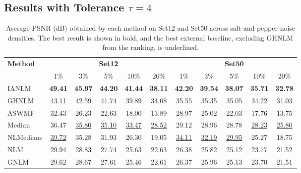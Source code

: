\documentclass[pdflatex,iicol,sn-mathphys-num]{sn-jnl}
\newcommand{\method}{IANLM\xspace}
\newcommand{\ghnlm}{GHNLM\xspace}
\newcommand{\nlm}{NLM\xspace}
\newcommand{\gnlm}{GNLM\xspace}
\newcommand{\aswmf}{ASWMF\xspace}
\newcommand{\nlmedian}{NLMedians\xspace}
\begin{document}
\subsection{Results with Tolerance \texorpdfstring{$\tau=4$}{tau=4}}
\label{subsec:results_tau4}
\begin{table}[!t]
  \centering
  \caption{Average PSNR (dB) obtained by each method on Set12 and Set50 across salt-and-pepper noise densities. The best result is shown in bold, and the best external baseline, excluding GHNLM from the ranking, is underlined.}
  \label{tab:psnr_by_density}
  \scriptsize
  \setlength{\tabcolsep}{4pt}
  \renewcommand{\arraystretch}{1.12}
  \begin{tabular*}{\textwidth}{@{\extracolsep{\fill}}lccccc|ccccc}
  \toprule
  \multirow{2}{*}{\textbf{Method}} &
  \multicolumn{5}{c|}{\textbf{Set12}} &
  \multicolumn{5}{c}{\textbf{Set50}} \\
  \cmidrule(lr){2-6}\cmidrule(lr){7-11}
  & 1\% & 3\% & 5\% & 10\% & 20\%
  & 1\% & 3\% & 5\% & 10\% & 20\% \\
  \midrule

  \method
  & \textbf{49.41}
  & \textbf{45.97}
  & \textbf{44.20}
  & \textbf{41.44}
  & \textbf{38.11}
  & \textbf{42.20}
  & \textbf{39.54}
  & \textbf{38.07}
  & \textbf{35.71}
  & \textbf{32.78} \\

  \ghnlm
  & 43.11
  & 42.59
  & 41.74
  & 39.89
  & 34.08
  & 35.55
  & 35.35
  & 35.05
  & 34.22
  & 31.03 \\

  \aswmf
  & 32.43
  & 26.23
  & 22.63
  & 18.00
  & 13.89
  & 28.97
  & 25.02
  & 22.03
  & 17.76
  & 13.75 \\

  Median
  & 36.47
  & \underline{35.80}
  & \underline{35.10}
  & \underline{33.47}
  & \underline{28.52}
  & 29.12
  & 28.96
  & 28.78
  & \underline{28.23}
  & \underline{25.80} \\

  \nlmedian
  & \underline{39.72}
  & 35.28
  & 31.93
  & 26.30
  & 19.05
  & \underline{34.11}
  & \underline{32.19}
  & \underline{29.95}
  & 25.27
  & 18.75 \\

  \nlm
  & 29.94
  & 28.83
  & 27.74
  & 25.63
  & 22.63
  & 26.38
  & 25.82
  & 25.12
  & 23.77
  & 21.52 \\

  \gnlm
  & 29.62
  & 28.67
  & 27.61
  & 25.46
  & 22.61
  & 26.37
  & 25.96
  & 25.13
  & 23.70
  & 21.51 \\

  \bottomrule
  \end{tabular*}
\end{table}
\end{document}
